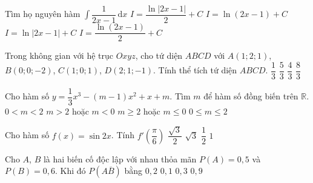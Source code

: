 \begin{ex}%
	Tìm họ nguyên hàm $\displaystyle \int \limits\dfrac{1}{2x-1} \mathrm{\,d}x$
	\choice
	{\True $I=\dfrac{\ln |2x-1|}{2}+C$}
	{$I=\ln (2x-1)+C$}
	{$I=\ln |2x-1|+C$}
	{$I=\dfrac{\ln (2x-1)}{2}+C$}
\end{ex}
\begin{ex}%
	Trong không gian với hệ trục $Oxyz$, cho tứ diện $ABCD$ với $A(1;2;1)$, $B(0;0;-2)$, $C(1;0;1)$, $D(2;1;-1)$. Tính thể tích tứ diện $ABCD$.
	\choice
	{$\dfrac{1}{3}$}	{\True $\dfrac{5}{3}$} 		{$\dfrac{4}{3}$} {$\dfrac{8}{3}$}
	
\end{ex}
\begin{ex}%
	Cho hàm số $y=\dfrac{1}{3}x^3-(m-1)x^2+x+m$. Tìm $m$ để hàm số đồng biến trên $\mathbb{R}$.
	\choice
	{$0<m<2$}	{\True $m>2$ hoặc $m<0$}	{$m\ge 2$ hoặc $m\le 0$}	{$0\le m\le 2$}
	
\end{ex}
\begin{ex}%
	Cho hàm số $f(x)=\sin 2x$. Tính $f'\left(\dfrac{\pi}{6}\right)$
	\choice
	{$\dfrac{\sqrt{3}}{2}$} {$\sqrt{3}$} {$\dfrac{1}{2}$} {\True $1$}
	
\end{ex}
\begin{ex}%
	Cho $A$, $B$ là hai biến cố độc lập với nhau thỏa mãn $P(A)=0,5$ và $P(B)=0,6$. Khi đó $P(A\overline{B})$ bằng
	\choice
	{\True $0,2$} {$0,1$}	{$0,3$}	{$0,9$}
	
\end{ex}



